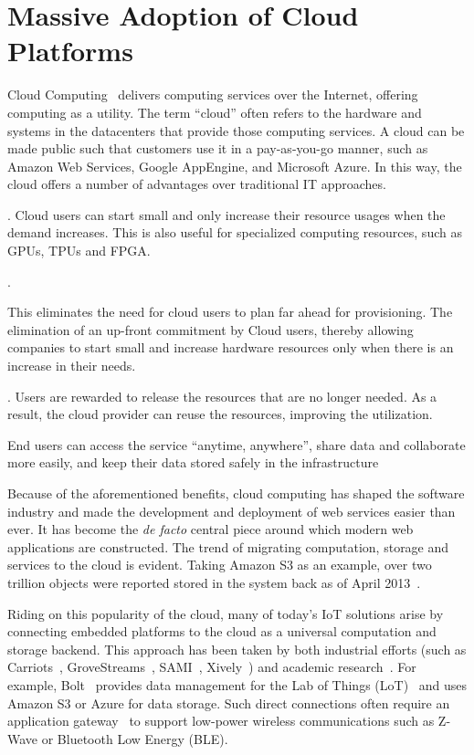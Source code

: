 \section{Massive Adoption of Cloud Platforms}
\label{sec:cloud}

Cloud Computing~\cite{armbrust2010view} delivers computing services over the
Internet, offering computing as a utility. The term ``cloud'' often refers to
the hardware and systems in the datacenters that provide those computing
services. A cloud can be made public such that customers use it in a
pay-as-you-go manner, such as Amazon Web Services, Google AppEngine, and
Microsoft Azure. In this way, the cloud offers a number of advantages over
traditional IT approaches.

. Cloud users can start small and only increase their resource
usages when the demand increases. This is also useful for specialized computing
resources, such as GPUs, TPUs and FPGA.

.

This eliminates the need for cloud users to plan far ahead for provisioning. The
elimination of an up-front commitment by Cloud users, thereby allowing companies
to start small and increase hardware resources only when there is an increase in
their needs.

.  Users are
rewarded to release the resources that are no longer needed. As a result, the
cloud provider can reuse the resources, improving the utilization.

 End users can access
the service ``anytime, anywhere'', share data and collaborate more easily, and
keep their data stored safely in the infrastructure

Because of the aforementioned benefits, cloud computing has shaped the software
industry and made the development and deployment of web services easier than
ever. It has become the \textit{de facto} central piece around which modern web
applications are constructed. The trend of migrating computation, storage and
services to the cloud is evident. Taking Amazon S3 as an example, over two
trillion objects were reported stored in the system back as of April
2013~\cite{barr2013amazon}.

Riding on this popularity of the cloud, many of today's IoT solutions arise by
connecting embedded platforms to the cloud as a universal computation and
storage backend. This approach has been taken by both industrial efforts (such
as Carriots~\cite{carriots}, GroveStreams~\cite{grovestreams}, SAMI~\cite{sami},
Xively~\cite{xively}) and academic research~\cite{gupta2014bolt,
  zachariah1001internet}. For example, Bolt~\cite{gupta2014bolt} provides data
management for the Lab of Things (LoT)~\cite{brush2013lab} and uses Amazon S3 or
Azure for data storage. Such direct connections often require an application
gateway~\cite{zachariah1001internet} to support low-power wireless
communications such as Z-Wave or Bluetooth Low Energy (BLE).

